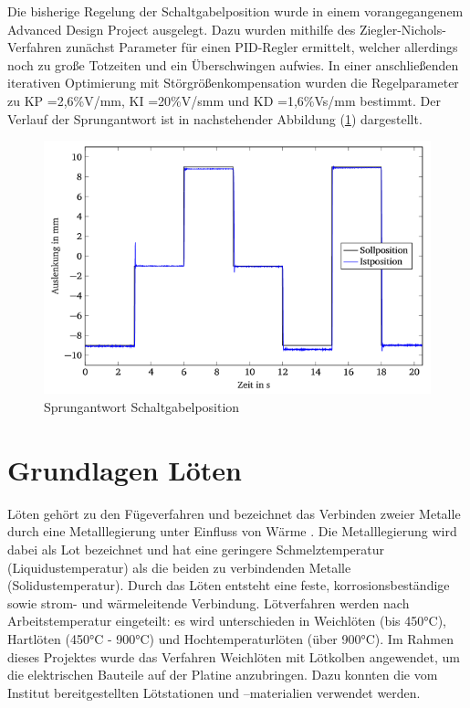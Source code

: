 Die bisherige Regelung der Schaltgabelposition wurde in einem vorangegangenem Advanced Design Project ausgelegt. Dazu wurden mithilfe des Ziegler-Nichols-Verfahren zunächst Parameter für einen PID-Regler ermittelt, welcher allerdings noch zu große Totzeiten und ein Überschwingen aufwies. In einer anschließenden iterativen Optimierung mit Störgrößenkompensation wurden die Regelparameter zu KP =2,6\%V/mm, KI =20\%V/smm und KD =1,6\%Vs/mm bestimmt. Der Verlauf der Sprungantwort ist in nachstehender Abbildung (\ref{fig:Sprungantwort Schaltgabelposition}) dargestellt.
\begin{figure}[h]
	\centering
		\includegraphics{Bilder/Sprungantwort Schaltgabelposition.png}
	\caption{Sprungantwort Schaltgabelposition \cite[S.35]{adp}}
	\label{fig:Sprungantwort Schaltgabelposition}
\end{figure}

\section{Grundlagen Löten}
Löten gehört zu den Fügeverfahren und bezeichnet das Verbinden zweier Metalle durch eine Metalllegierung unter Einfluss von Wärme \cite{löten}. Die Metalllegierung wird dabei als Lot bezeichnet und hat eine geringere Schmelztemperatur (Liquidustemperatur) als die beiden zu verbindenden Metalle (Solidustemperatur). Durch das Löten entsteht eine feste, korrosionsbeständige sowie strom- und wärmeleitende Verbindung. Lötverfahren werden nach Arbeitstemperatur eingeteilt: es wird unterschieden in Weichlöten (bis 450°C), Hartlöten (450°C - 900°C) und Hochtemperaturlöten (über 900°C). Im Rahmen dieses Projektes wurde das Verfahren Weichlöten mit Lötkolben angewendet, um die elektrischen Bauteile auf der Platine anzubringen. Dazu konnten die vom Institut bereitgestellten Lötstationen und –materialien verwendet werden. 

